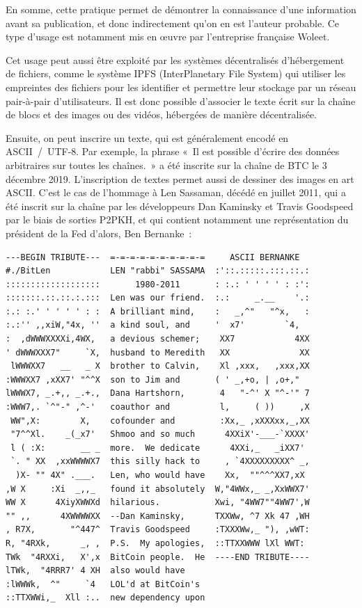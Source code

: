 En somme, cette pratique permet de démontrer la connaissance d'une information avant sa publication, et donc indirectement qu'on en est l'auteur probable. Ce type d'usage est notamment mis en œuvre par l'entreprise française Woleet.

Cet usage peut aussi être exploité par les systèmes décentralisés d'hébergement de fichiers, comme le système IPFS (InterPlanetary File System) qui utiliser les empreintes des fichiers pour les identifier et permettre leur stockage par un réseau pair-à-pair d'utilisateurs. Il est donc possible d'associer le texte écrit sur la chaîne de blocs et des images ou des vidéos, hébergées de manière décentralisée.

Ensuite, on peut inscrire un texte, qui est généralement encodé en ASCII~/~UTF-8. Par exemple, la phrase «~Il est possible d'écrire des données arbitraires sur toutes les chaînes.~» a été inscrite sur la chaîne de BTC le 3 décembre 2019. L'inscription de textes permet aussi de dessiner des images en art ASCII. C'est le cas de l'hommage à Len Sassaman, décédé en juillet 2011, qui a été inscrit sur la chaîne par les développeurs Dan Kaminsky et Travis Goodspeed par le biais de sorties P2PKH, et qui contient notamment une représentation du président de la Fed d'alors, Ben Bernanke~:

\begin{Verbatim}[fontsize=\small]
---BEGIN TRIBUTE---  =-=-=-=-=-=-=-=-=-=     ASCII BERNANKE
#./BitLen            LEN "rabbi" SASSAMA  :'::.:::::.:::.::.:
:::::::::::::::::::       1980-2011       : :.: ' ' ' ' : :':
:::::::.::.::.:.:::  Len was our friend.  :.:     _.__    '.:
:.: :.' ' ' ' ' : :  A brilliant mind,    :   _,^"   "^x,   :
:.:'' ,,xiW,"4x, ''  a kind soul, and     '  x7'        `4,
:  ,dWWWXXXXi,4WX,   a devious schemer;    XX7            4XX
' dWWWXXX7"     `X,  husband to Meredith   XX              XX
 lWWWXX7   __   _ X  brother to Calvin,    Xl ,xxx,   ,xxx,XX
:WWWXX7 ,xXX7' "^^X  son to Jim and       ( ' _,+o, | ,o+,"
lWWWX7, _.+,, _.+.,  Dana Hartshorn,       4   "-^' X "^-'" 7
:WWW7,. `^"-" ,^-'   coauthor and          l,     ( ))     ,X
 WW",X:        X,    cofounder and         :Xx,_ ,xXXXxx,_,XX
 "7^^Xl.    _(_x7'   Shmoo and so much      4XXiX'-___-`XXXX'
 l ( :X:       __ _  more.  We dedicate      4XXi,_   _iXX7'
 `. " XX  ,xxWWWWX7  this silly hack to     , `4XXXXXXXXX^ _,
  )X- "" 4X" .___.   Len, who would have    Xx,  ""^^^XX7,xX
,W X     :Xi  _,,_   found it absolutely  W,"4WWx,_ _,XxWWX7'
WW X      4XiyXWWXd  hilarious.           Xwi, "4WW7""4WW7',W
"" ,,      4XWWWWXX  --Dan Kaminsky,      TXXWw, ^7 Xk 47 ,WH
, R7X,       "^447^  Travis Goodspeed     :TXXXWw,_ "), ,wWT:
R, "4RXk,      _, ,  P.S.  My apologies,  ::TTXXWWW lXl WWT:
TWk  "4RXXi,   X',x  BitCoin people.  He  ----END TRIBUTE----
lTWk,  "4RRR7' 4 XH  also would have
:lWWWk,  ^"     `4   LOL'd at BitCoin's
::TTXWWi,_  Xll :..  new dependency upon
\end{Verbatim}

